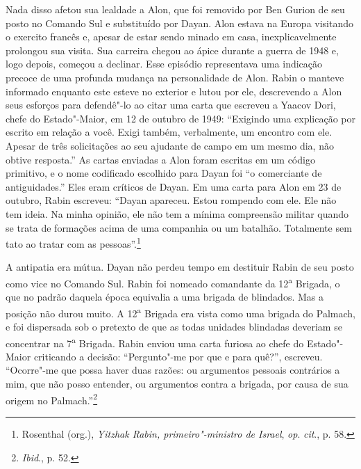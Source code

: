 Nada disso afetou sua lealdade a Alon, que foi removido por Ben Gurion
de seu posto no Comando Sul e substituído por Dayan. Alon estava na
Europa visitando o exercito francês e, apesar de estar sendo minado em
casa, inexplicavelmente prolongou sua visita. Sua carreira chegou
ao ápice durante a guerra de 1948 e, logo depois, começou a declinar.
Esse episódio representava uma indicação precoce de uma profunda mudança
na personalidade de Alon. Rabin o manteve informado enquanto este
esteve no exterior e lutou por ele, descrevendo a Alon seus esforços
para defendê"-lo ao citar uma carta que escreveu a Yaacov Dori, chefe do
Estado"-Maior, em 12 de outubro de 1949: ``Exigindo uma explicação por
escrito em relação a você. Exigi também, verbalmente, um encontro com
ele. Apesar de três solicitações ao seu ajudante de campo em um mesmo
dia, não obtive resposta.'' As cartas enviadas a Alon foram escritas em
um código primitivo, e o nome codificado escolhido para Dayan foi ``o
comerciante de antiguidades.'' Eles eram críticos de Dayan. Em uma carta
para Alon em 23 de outubro, Rabin escreveu: ``Dayan apareceu. Estou
rompendo com ele. Ele não tem ideia. Na minha opinião, ele não tem a
mínima compreensão militar quando se trata de formações acima de uma
companhia ou um batalhão. Totalmente sem tato ao tratar com as
pessoas''.\footnote{Rosenthal (org.), \textit{Yitzhak Rabin, primeiro"-ministro de Israel}, \textit{op}. \textit{cit}., p. 58.}

A antipatia era mútua. Dayan não perdeu tempo em destituir Rabin de seu
posto como vice no Comando Sul. Rabin foi nomeado comandante da
12\textsuperscript{a} Brigada, o que no padrão daquela época equivalia a
uma brigada de blindados. Mas a posição não durou muito. A
12\textsuperscript{a} Brigada era vista como uma brigada do Palmach, e
foi dispersada sob o pretexto de que as todas unidades blindadas
deveriam se concentrar na 7\textsuperscript{a} Brigada. Rabin enviou
uma carta furiosa ao chefe do Estado"-Maior criticando a decisão: ``Pergunto"-me por que e para quê?'', escreveu. ``Ocorre"-me que possa
haver duas razões: ou argumentos pessoais contrários a mim, que não
posso entender, ou argumentos contra a brigada, por causa de sua origem
no Palmach.''\footnote{\textit{Ibid}., p. 52.}

